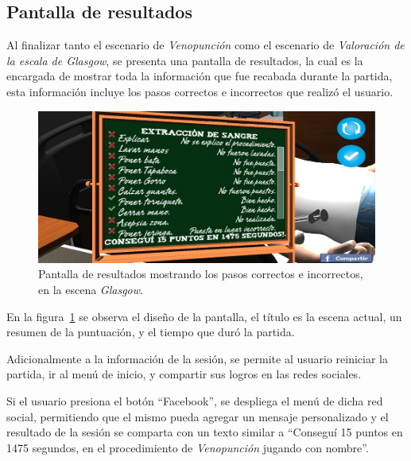 \subsection{Pantalla de resultados}

Al finalizar tanto el escenario de \emph{Venopunción} como el escenario de \emph{Valoración de 
la escala de Glasgow}, se presenta una pantalla de resultados, la cual es
la encargada de mostrar toda la información que fue recabada durante la partida,
esta información incluye los pasos correctos e incorrectos que realizó el
usuario.

\begin{figure}[H]
\centering
\includegraphics[scale=0.5]{solucion/images/resultado_hemocultivo.jpg}
\caption{Pantalla de resultados mostrando los pasos correctos e incorrectos, en
    la escena \emph{Glasgow}.}
\label{fig:resultados_glasgow}
\end{figure}

En la figura~\ref{fig:resultados_glasgow} se observa el diseño de la
pantalla, el título es la escena actual, un resumen de la
puntuación, y el tiempo que duró la partida.

Adicionalmente a la información de la sesión, se permite al usuario reiniciar la
partida, ir al menú de inicio, y compartir sus logros en las redes sociales.

Si el usuario presiona el botón \enquote{Facebook}, se despliega el menú de
dicha red social, permitiendo que el mismo pueda agregar un mensaje
personalizado y el resultado de la sesión se comparta con un texto similar a \enquote{Conseguí 15 puntos
    en 1475 segundos, en el procedimiento de \emph{Venopunción} jugando con
    \gls{nombre}}.

